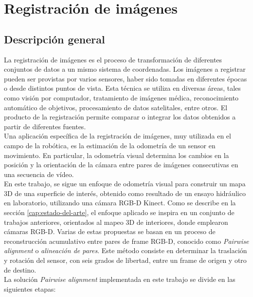	 	 	

\chapter{Registración de imágenes}

\section{Descripción general}
\label{sec:descripcion-general-registracion}

La registración de imágenes es el proceso de transformación de diferentes conjuntos de datos a un mismo sistema de coordenadas. Los imágenes a registrar pueden ser provistas por varios sensores, haber sido tomadas en diferentes épocas o desde distintos puntos de vista. Esta técnica se utiliza en diversas áreas, tales como visión por computador, tratamiento de imágenes médica, reconocimiento automático de objetivos, procesamiento de datos satelitales, entre otros. El producto de la registración permite comparar o integrar los datos obtenidos a partir de diferentes fuentes. \\
Una aplicación específica de la registración de imágenes, muy utilizada en el campo de la robótica, es la estimación de la odometría de un sensor en movimiento. En particular, la odometría visual determina los cambios en la posición y la orientación de la cámara entre pares de imágenes consecutivas en una secuencia de vídeo. \\
En este trabajo, se sigue un enfoque de odometría visual para construir un mapa 3D de una superficie de interés, obtenido como resultado de un ensayo hidráulico en laboratorio, utilizando una cámara RGB-D Kinect. Como se describe en la sección \ref{cap:estado-del-arte}, el enfoque aplicado se inspira en un conjunto de trabajos anteriores, orientados al mapeo 3D de interiores, donde emplearon cámaras RGB-D. Varias de estas propuestas se basan en un proceso de reconstrucción acumulativo entre pares de frame RGB-D, conocido como \textit{Pairwise alignment} o \textit{alineación de pares}. Este método consiste en determinar la traslación y rotación del sensor, con seis grados de libertad, entre un frame de origen y otro de destino. \\
La solución \textit{Pairwise alignment} implementada en este trabajo se divide en las siguientes etapas:
